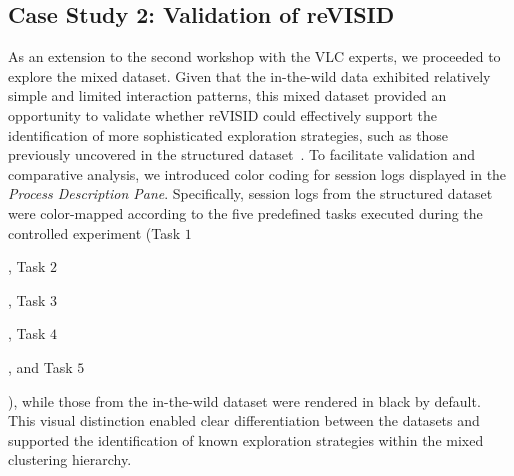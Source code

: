 \documentclass[preprint,journal]{vgtc}            %
\newcommand{\px}{0.0104167in} %
\begin{document}


\subsection{Case Study 2: Validation of reVISID}
\label{subsec:case_2}

As an extension to the second workshop with the VLC experts, we proceeded to explore the mixed dataset.
Given that the in-the-wild data exhibited relatively simple and limited interaction patterns, this mixed dataset provided an opportunity to validate whether reVISID could effectively support the identification of more sophisticated exploration strategies, such as those previously uncovered in the structured dataset~\cite{Yu25Revealing}.
To facilitate validation and comparative analysis, we introduced color coding for session logs displayed in the \textit{Process Description Pane}.
Specifically, session logs from the structured dataset were color-mapped according to the five predefined tasks executed during the controlled experiment 
(Task $1$ , 
Task $2$ , 
Task $3$ , 
Task $4$ , 
and Task $5$  
), while those from the in-the-wild dataset were rendered in black by default.
This visual distinction enabled clear differentiation between the datasets and supported the identification of known exploration strategies within the mixed clustering hierarchy.
\end{document}
